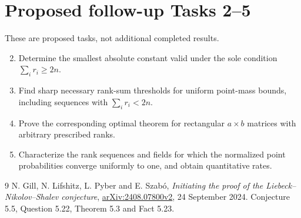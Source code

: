 \documentclass[11pt]{article}
\begin{document}
\section*{Proposed follow-up Tasks 2--5}
These are proposed tasks, not additional completed results.
\begin{enumerate}
\setcounter{enumi}{1}
\item Determine the smallest absolute constant valid under the sole
condition $\sum_i r_i\ge2n$.
\item Find sharp necessary rank-sum thresholds for uniform point-mass
bounds, including sequences with $\sum_i r_i<2n$.
\item Prove the corresponding optimal theorem for rectangular
$a\times b$ matrices with arbitrary prescribed ranks.
\item Characterize the rank sequences and fields for which the normalized
point probabilities converge uniformly to one, and obtain quantitative rates.
\end{enumerate}
\begin{thebibliography}{9}
 N. Gill, N. Lifshitz, L. Pyber and E. Szab\'o,
\emph{Initiating the proof of the Liebeck--Nikolov--Shalev conjecture},
\href{https://arxiv.org/abs/2408.07800v2}{arXiv:2408.07800v2}, 24 September 2024.
Conjecture 5.5, Question 5.22, Theorem 5.3 and Fact 5.23.
\end{thebibliography}
\end{document}
